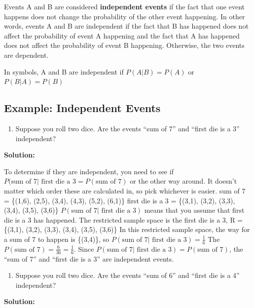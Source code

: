 \documentclass[
]{book}
\providecommand{\tightlist}{%
  \setlength{\itemsep}{0pt}\setlength{\parskip}{0pt}}
\begin{document}
Events A and B are considered \textbf{independent events} if the fact that one event happens does not change the probability of the other event happening. In other words, events A and B are independent if the fact that B has happened does not affect the probability of event A happening and the fact that A has happened does not affect the probability of event B happening. Otherwise, the two events are dependent.

In symbols, A and B are independent if \(P(A|B)=P(A)\) or \(P(B|A)=P(B)\)

\hypertarget{example-independent-events}{%
\subsection{Example: Independent Events}\label{example-independent-events}}

\begin{enumerate}
\def\labelenumi{\alph{enumi}.}
\tightlist
\item
  Suppose you roll two dice. Are the events ``sum of 7'' and ``first die is a 3'' independent?
\end{enumerate}

\textbf{Solution:}

To determine if they are independent, you need to see if \(P(\text{sum of 7| first die a 3}=P(\text{sum of 7})\) or the other way around. It doesn't matter which order these are calculated in, so pick whichever is easier.
sum of 7 = \{(1,6), (2,5), (3,4), (4,3), (5,2), (6,1)\}
first die is a 3 = \{(3,1), (3,2), (3,3), (3,4), (3,5), (3,6)\}
\(P(\text{sum of 7| first die a 3})\) means that you assume that first die is a 3 has happened. The restricted sample space is the first die is a 3, R = \{(3,1), (3,2), (3,3), (3,4), (3,5), (3,6)\}
In this restricted sample space, the way for a sum of 7 to happen is \{(3,4)\},
so \(P(\text{sum of 7| first die a 3})=\frac{1}{6}\)
The \(P(\text{sum of 7})=\frac{6}{36}=\frac{1}{6}\).
Since \(P(\text{sum of 7| first die a 3})=P(\text{sum of 7})\), the ``sum of 7'' and ``first die is a 3'' are independent events.

\begin{enumerate}
\def\labelenumi{\alph{enumi}.}
\setcounter{enumi}{1}
\tightlist
\item
  Suppose you roll two dice. Are the events ``sum of 6'' and ``first die is a 4'' independent?
\end{enumerate}

\textbf{Solution:}
\end{document}
